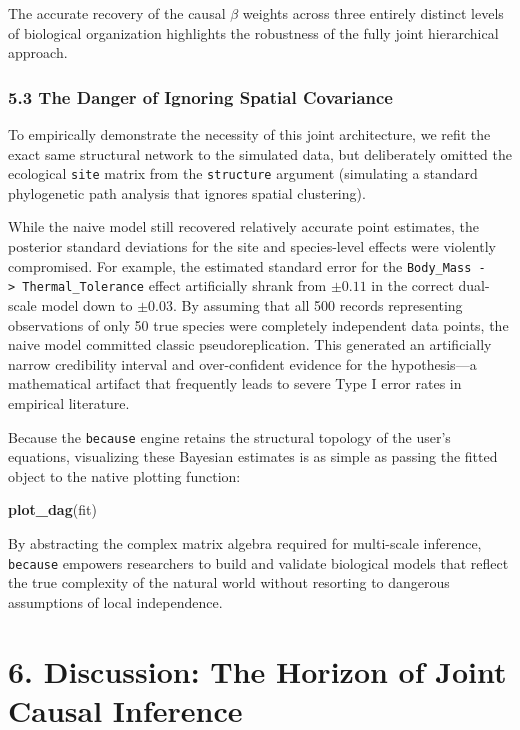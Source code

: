 \documentclass[
]{article}
\newenvironment{Shaded}{\begin{snugshade}}{\end{snugshade}}
\newcommand{\FunctionTok}[1]{\textcolor[rgb]{0.13,0.29,0.53}{\textbf{#1}}}
\newcommand{\NormalTok}[1]{#1}
\begin{document}
The accurate recovery of the causal \(\beta\) weights across three entirely distinct levels of biological organization highlights the robustness of the fully joint hierarchical approach.

\subsubsection{5.3 The Danger of Ignoring Spatial Covariance}\label{the-danger-of-ignoring-spatial-covariance}

To empirically demonstrate the necessity of this joint architecture, we refit the exact same structural network to the simulated data, but deliberately omitted the ecological \texttt{site} matrix from the \texttt{structure} argument (simulating a standard phylogenetic path analysis that ignores spatial clustering).

While the naive model still recovered relatively accurate point estimates, the posterior standard deviations for the site and species-level effects were violently compromised. For example, the estimated standard error for the \texttt{Body\_Mass\ -\textgreater{}\ Thermal\_Tolerance} effect artificially shrank from \(\pm 0.11\) in the correct dual-scale model down to \(\pm 0.03\). By assuming that all 500 records representing observations of only 50 true species were completely independent data points, the naive model committed classic pseudoreplication. This generated an artificially narrow credibility interval and over-confident evidence for the hypothesis---a mathematical artifact that frequently leads to severe Type I error rates in empirical literature.

Because the \texttt{because} engine retains the structural topology of the user's equations, visualizing these Bayesian estimates is as simple as passing the fitted object to the native plotting function:

\begin{Shaded}
\begin{Highlighting}[]
\FunctionTok{plot\_dag}\NormalTok{(fit)}
\end{Highlighting}
\end{Shaded}

By abstracting the complex matrix algebra required for multi-scale inference, \texttt{because} empowers researchers to build and validate biological models that reflect the true complexity of the natural world without resorting to dangerous assumptions of local independence.

\section{6. Discussion: The Horizon of Joint Causal Inference}\label{discussion-the-horizon-of-joint-causal-inference}
\end{document}
